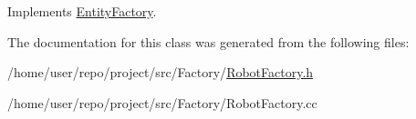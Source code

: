 Implements \hyperlink{classEntityFactory_a7f579ca02f15935e6901e5c955c9726a}{Entity\+Factory}.



The documentation for this class was generated from the following files\+:\begin{DoxyCompactItemize}
\item 
/home/user/repo/project/src/\+Factory/\hyperlink{RobotFactory_8h}{Robot\+Factory.\+h}\item 
/home/user/repo/project/src/\+Factory/Robot\+Factory.\+cc\end{DoxyCompactItemize}
